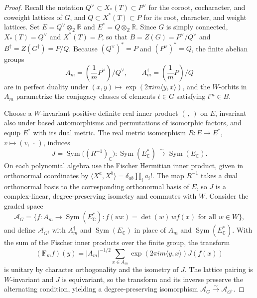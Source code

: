 \documentclass[11pt,a4paper,reqno]{amsart}
\theoremstyle{plain}
\theoremstyle{definition}
\theoremstyle{remark}
\numberwithin{equation}{section}
\DeclareMathOperator{\Sym}{Sym}
\newcommand{\CC}{\mathbb C}
\newcommand{\ZZ}{\mathbb Z}
\newcommand{\RR}{\mathbb R}
\newcommand{\pair}[2]{\langle #1,#2\rangle}
\newcommand{\eexp}[1]{\exp(2\pi i #1)}
\begin{document}
\begin{proof}
Recall the notation $Q^\vee\subset X_*(T)\subset P^\vee$ for the coroot, cocharacter, and coweight lattices of $G$, and $Q\subset X^*(T)\subset P$ for its root, character, and weight lattices. Set $E=Q^\vee\otimes_{\ZZ}\RR$ and $E^*=Q\otimes_{\ZZ}\RR$. Since $G$ is simply connected, $X_*(T)=Q^\vee$ and $X^*(T)=P$, so that $B=Z(G)=P^\vee/Q^\vee$ and $B^\dagger=Z(G^\dagger)=P/Q$. Because $(Q^\vee)^*=P$ and $(P^\vee)^*=Q$, the finite abelian groups
\[
A_m=\left(\frac{1}{m}P^\vee\right)/Q^\vee,\qquad A_m^\dagger=\left(\frac{1}{m}P\right)/Q
\]
are in perfect duality under $(x,y)\mapsto\eexp{m\pair{y}{x}}$, and the $W$-orbits in $A_m$ parametrize the conjugacy classes of elements $t\in G$ satisfying $t^m\in B$.

Choose a $W$-invariant positive definite real inner product $(\, ,\,)$ on $E$, invariant also under based automorphisms and permutations of isomorphic factors, and equip $E^*$ with its dual metric. The real metric isomorphism $R\colon E\to E^*$, $v\mapsto(v,\,\cdot\,)$, induces
\[
J=\Sym\bigl((R^{-1})_{\CC}\bigr)\colon
\Sym(E_{\CC}^*)\xrightarrow{\sim}\Sym(E_{\CC}).
\]
On each polynomial algebra use the Fischer Hermitian inner product, given in orthonormal coordinates by $\langle X^a,X^b\rangle=\delta_{ab}\prod_i a_i!$. The map $R^{-1}$ takes a dual orthonormal basis to the corresponding orthonormal basis of $E$, so $J$ is a complex-linear, degree-preserving isometry and commutes with $W$. Consider the graded space
\[
\mathscr A_G=\{f\colon A_m\to\Sym(E_{\CC}^*): f(wx)=\det(w)\,w f(x)\text{ for all }w\in W\},
\]
and define $\mathscr A_{G^\dagger}$ with $A_m^\dagger$ and $\Sym(E_{\CC})$ in place of $A_m$ and $\Sym(E_{\CC}^*)$. With the sum of the Fischer inner products over the finite group, the transform
\[
(\mathbf F_m f)(y)=|A_m|^{-1/2}\sum_{x\in A_m}\eexp{m\pair{y}{x}}J(f(x))
\]
is unitary by character orthogonality and the isometry of $J$. The lattice pairing is $W$-invariant and $J$ is equivariant, so the transform and its inverse preserve the alternating condition, yielding a degree-preserving isomorphism $\mathscr A_G\xrightarrow{\sim}\mathscr A_{G^\dagger}$.


\end{proof}
\end{document}
